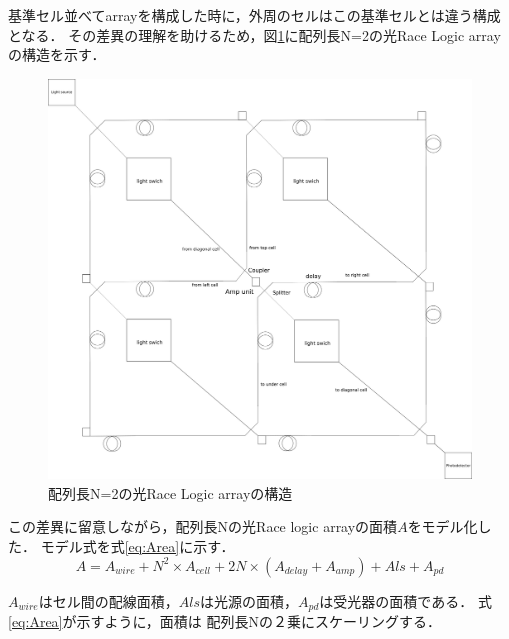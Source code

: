 基準セル並べてarrayを構成した時に，外周のセルはこの基準セルとは違う構成となる．
その差異の理解を助けるため，図\ref{fig:N=2}に配列長N=2の光Race Logic arrayの構造を示す．
\begin{figure}[t!]
\begin{center}
\includegraphics[keepaspectratio,scale=0.35]{fig/4/lightracelogic_N_2.png}
\caption{配列長N=2の光Race Logic arrayの構造}
\label{fig:N=2}
\end{center}
\end{figure}

この差異に留意しながら，配列長Nの光Race logic arrayの面積$A$をモデル化した．
モデル式を式\ref{eq:Area}に示す．
\begin{equation}
A = A_{wire}+N^2 \times A_{cell} + 2N \times (A_{delay}+A_{amp}) +A{ls}+A_{pd}
\label{eq:Area}
\end{equation}

$A_{wire}はセル間の配線面積，A{ls}は光源の面積，A_{pd}は受光器の面積である．$
式\ref{eq:Area}が示すように，面積は
配列長Nの２乗にスケーリングする．

